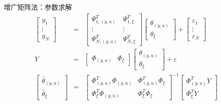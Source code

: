 \begin{frame}{增广矩阵法：参数求解}
\begin{eqnarray*}
\begin{bmatrix} y_1 \\ \vdots \\ y_{N} \end{bmatrix}&=& 
\begin{bmatrix} \Psi_{1,(y,u)}^T & \Psi_{1,\xi}^T  \\
\vdots & \vdots \\
\Psi_{N,(y,u)}^T & \Psi_{N,\xi}^T
\end{bmatrix} \begin{bmatrix}\theta_{(y,u)} \\ \theta_\xi \end{bmatrix} + 
\begin{bmatrix} \varepsilon_1 \\ \vdots \\ \varepsilon_N \end{bmatrix}\\
Y &=& \begin{bmatrix} \Phi_{(y,u)} & \Phi_\xi \end{bmatrix} \begin{bmatrix}\theta_{(y,u)} \\ \theta_\xi \end{bmatrix} + \varepsilon \\
\begin{bmatrix}\hat\theta_{(y,u)} \\ \hat\theta_\xi \end{bmatrix} &=& \begin{bmatrix}\Phi_{(y,u)}^T\Phi_{(y,u)} & \Phi_{(y,u)}^T\Phi_\xi \\ \Phi_\xi^T\Phi_{(y,u)} & \Phi_\xi^T\Phi_\xi \end{bmatrix}^{-1}\begin{bmatrix}\Phi_{(y,u)}^T Y \\ \Phi_\xi^T Y\end{bmatrix}
\end{eqnarray*}
\end{frame}

